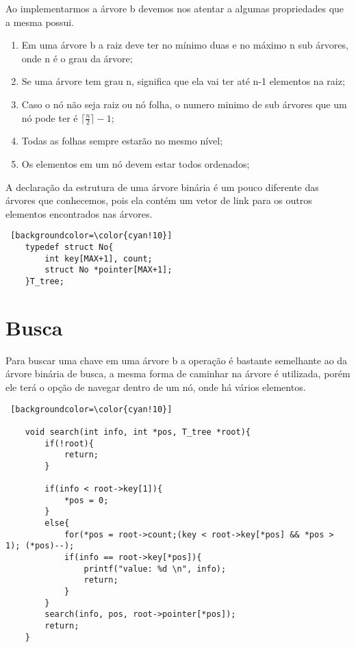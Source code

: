\documentclass[report]{uftex}
\begin{document}
    Ao implementarmos a árvore b devemos nos atentar a algumas propriedades que a mesma possui.

\begin{enumerate}
    \item Em uma árvore b a raiz deve ter no mínimo duas e no máximo n sub árvores, onde n é o grau da árvore;
    \item Se uma árvore tem grau n, significa que ela vai ter até n-1 elementos na raiz;
    \item Caso o nó não seja raiz ou nó folha, o numero minimo de sub árvores que um nó pode ter é $ \lceil \frac{n}{2} \rceil-1$;
    \item Todas as folhas sempre estarão no mesmo nível;
    \item Os elementos em um nó devem estar todos ordenados;
\end{enumerate}

A declaração da estrutura de uma árvore binária é um pouco diferente das árvores que conhecemos, pois ela contém um vetor de link para os outros elementos encontrados nas árvores.\\

\begin{lstlisting} [backgroundcolor=\color{cyan!10}]
    typedef struct No{
	    int key[MAX+1], count;
	    struct No *pointer[MAX+1];
    }T_tree;
\end{lstlisting}

\section{Busca}

    \noindent Para buscar uma chave em uma árvore b a operação é bastante semelhante ao da árvore binária de busca, a mesma forma de caminhar na árvore é utilizada, porém ele terá o opção de navegar dentro de um nó, onde há vários elementos.

\begin{lstlisting} [backgroundcolor=\color{cyan!10}]

    void search(int info, int *pos, T_tree *root){
        if(!root){
            return;
        }
    
        if(info < root->key[1]){
            *pos = 0;
        }
    	else{
            for(*pos = root->count;(key < root->key[*pos] && *pos > 1); (*pos)--);
            if(info == root->key[*pos]){
                printf("value: %d \n", info);
                return;
            }
        }
        search(info, pos, root->pointer[*pos]);
        return;
    }
    
\end{lstlisting}
\end{document}
